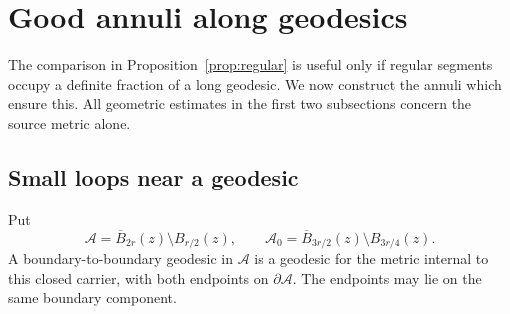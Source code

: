 \documentclass[11pt]{article}
\theoremstyle{definition}
\theoremstyle{remark}
\begin{document}
\section{Good annuli along geodesics}\label{sec:annuli}
The comparison in Proposition~\ref{prop:regular} is useful only
if regular segments occupy a definite fraction of a long geodesic.
We now construct the annuli which ensure this. All geometric
estimates in the first two subsections concern the source metric
alone.

\subsection{Small loops near a geodesic}
Put
\[
 \mathcal A=\overline B_{2r}(z)\setminus B_{r/2}(z),\qquad
 \mathcal A_0=\overline B_{3r/2}(z)\setminus B_{3r/4}(z).
\]
A boundary-to-boundary geodesic in $\mathcal A$ is a geodesic for
the metric internal to this closed carrier, with both endpoints
on $\partial\mathcal A$. The endpoints may lie on the same
boundary component.
\end{document}
